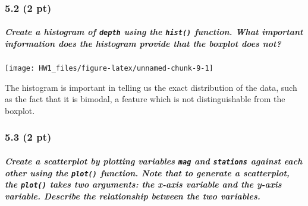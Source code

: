 \documentclass[
]{article}
\newenvironment{Shaded}{\begin{snugshade}}{\end{snugshade}}
\newcommand{\FunctionTok}[1]{\textcolor[rgb]{0.00,0.00,0.00}{#1}}
\newcommand{\NormalTok}[1]{#1}
\newcommand{\SpecialCharTok}[1]{\textcolor[rgb]{0.00,0.00,0.00}{#1}}
\begin{document}
\hypertarget{pt-2}{%
\subsubsection{5.2 (2 pt)}\label{pt-2}}

\hypertarget{create-a-histogram-of-depth-using-the-hist-function.-what-important-information-does-the-histogram-provide-that-the-boxplot-does-not}{%
\subparagraph{\texorpdfstring{Create a histogram of \texttt{depth} using
the \texttt{hist()} function. What important information does the
histogram provide that the boxplot does
not?}{Create a histogram of depth using the hist() function. What important information does the histogram provide that the boxplot does not?}}\label{create-a-histogram-of-depth-using-the-hist-function.-what-important-information-does-the-histogram-provide-that-the-boxplot-does-not}}

\begin{Shaded}
\end{Shaded}

\begin{center}\texttt{[image: HW1\_files/figure-latex/unnamed-chunk-9-1]} \end{center}

The histogram is important in telling us the exact distribution of the
data, such as the fact that it is bimodal, a feature which is not
distinguishable from the boxplot.

\hypertarget{pt-3}{%
\subsubsection{5.3 (2 pt)}\label{pt-3}}

\hypertarget{create-a-scatterplot-by-plotting-variables-mag-and-stations-against-each-other-using-the-plot-function.-note-that-to-generate-a-scatterplot-the-plot-takes-two-arguments-the-x-axis-variable-and-the-y-axis-variable.-describe-the-relationship-between-the-two-variables.}{%
\subparagraph{\texorpdfstring{Create a scatterplot by plotting variables
\texttt{mag} and \texttt{stations} against each other using the
\texttt{plot()} function. Note that to generate a scatterplot, the
\texttt{plot()} takes two arguments: the x-axis variable and the y-axis
variable. Describe the relationship between the two
variables.}{Create a scatterplot by plotting variables mag and stations against each other using the plot() function. Note that to generate a scatterplot, the plot() takes two arguments: the x-axis variable and the y-axis variable. Describe the relationship between the two variables.}}\label{create-a-scatterplot-by-plotting-variables-mag-and-stations-against-each-other-using-the-plot-function.-note-that-to-generate-a-scatterplot-the-plot-takes-two-arguments-the-x-axis-variable-and-the-y-axis-variable.-describe-the-relationship-between-the-two-variables.}}
\end{document}
